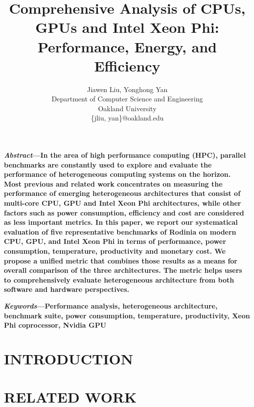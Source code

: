 \documentclass[10pt,pageno]{jpaper}
\begin{document}
\title{
Comprehensive Analysis of CPUs, GPUs and Intel Xeon Phi: Performance, Energy, and Efficiency}

\author{Jiawen Liu, Yonghong Yan \\
Department of Computer Science and Engineering\\
Oakland University\\
\{jliu, yan\}@oakland.edu
}

\date{}

\maketitle

\thispagestyle{empty}
\begin{small}
 \textbf{\textit{Abstract}—In the area of high performance computing (HPC), parallel benchmarks are constantly used to explore and evaluate the performance of heterogeneous computing systems on the horizon. 
Most previous and related work concentrates on measuring the performance of emerging heterogeneous architectures that consist of multi-core CPU, GPU and Intel Xeon Phi architectures, while other factors such as 
power consumption, efficiency and cost are considered as less important metrics.  
In this paper, we report our systematical evaluation of five representative benchmarks of Rodinia on modern CPU, GPU, and Intel Xeon Phi in terms of performance, 
power consumption, temperature, productivity and monetary cost. 
We propose a unified metric that combines those results as a means for overall comparison of the three architectures. 
The metric helps users to comprehensively evaluate heterogeneous architecture from both software and hardware perspectives.}

\textbf{\textit{Keywords}—Performance analysis, heterogeneous architecture, benchmark suite, power consumption, temperature, productivity, Xeon Phi coprocessor, Nvidia GPU}

\end{small}

\section{INTRODUCTION}
\label{sec:INTRODUCTION}


\section{RELATED WORK}
\label{sec:RELATED_WORK}

\end{document}

